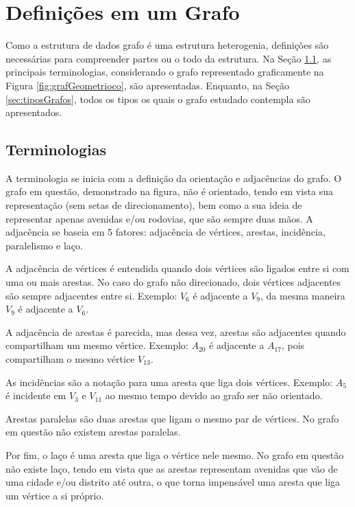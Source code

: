 \documentclass[
12pt,
a4paper,
semrecuonosumario,
sumario = abnt-6027-2012]{report}
\begin{document}
	\chapter{Definições em um Grafo }\label{cap:definicoesGrafo}

	Como a estrutura de dados grafo é uma estrutura heterogenia, definições são necessárias para compreender partes ou o todo da estrutura. Na Seção \ref{sec:terminologias}, as principais terminologias, considerando o grafo representado graficamente na Figura  \ref{fig:grafGeometrioco}, são apresentadas. Enquanto, na Seção \ref{sec:tiposGrafos}, todos os tipos os quais o grafo estudado contempla são apresentados.

	\section{Terminologias}\label{sec:terminologias}

A terminologia se inicia com a definição da orientação e adjacências do grafo.
O grafo em questão, demonstrado na figura, não é orientado, tendo em vista sua representação (sem setas de direcionamento), bem como a sua ideia de representar apenas avenidas e/ou rodovias, que são sempre duas mãos.
A adjacência se baseia em 5 fatores: adjacência de vértices, arestas, incidência, paralelismo e laço.

A adjacência de vértices é entendida quando dois vértices são ligados entre si com uma ou mais arestas.
No caso do grafo não direcionado, dois vértices adjacentes são sempre adjacentes entre si.
Exemplo: $V_6$ é adjacente a $V_9$, da mesma maneira $V_9$ é adjacente a $V_6$.

A adjacência de arestas é parecida, mas dessa vez, arestas são adjacentes quando compartilham um mesmo vértice.
Exemplo: $A_{20}$ é adjacente a $A_{17}$, pois compartilham o mesmo vértice $V_{13}$.

As incidências são a notação para uma aresta que liga dois vértices.
Exemplo: $A_{5}$ é incidente em $V_3$ e $V_{11}$ ao mesmo tempo devido ao grafo ser não orientado.

Arestas paralelas são duas arestas que ligam o mesmo par de vértices.
No grafo em questão não existem arestas paralelas.

Por fim, o laço é uma aresta que liga o vértice nele mesmo.
No grafo em questão não existe laço, tendo em vista que as arestas representam avenidas que vão de uma cidade e/ou distrito até outra, o que torna impensável uma aresta que liga um vértice a si próprio.
\end{document}
